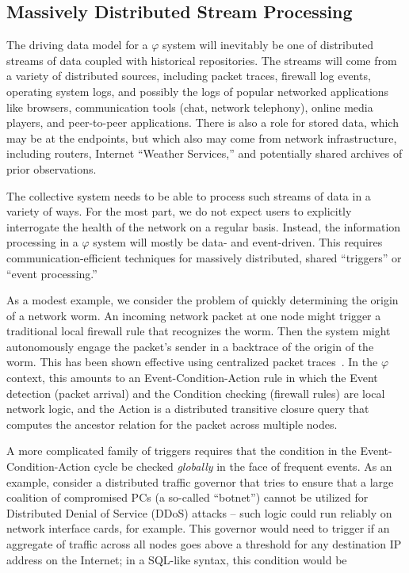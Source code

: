 \documentclass{acm_proc_article-sp}
\def\philogo{{\large $\varphi$}\xspace}
\begin{document}
\subsection{Massively Distributed Stream Processing} The driving data model for a \philogo system will inevitably be one of distributed streams of data coupled with historical repositories. The streams will come from a variety of distributed sources, including packet traces, firewall log events, operating system logs, and possibly the logs of popular networked applications like browsers, communication tools (chat, network telephony), online media players, and peer-to-peer applications. There is also a role for stored data, which may be at the endpoints, but which also may come from network infrastructure, including routers, Internet ``Weather Services,'' and potentially shared archives of prior observations.

The collective system needs to be able to process such streams of data in a variety of ways. For the most part, we do not expect users to explicitly interrogate the health of the network on a regular basis. Instead, the information processing in a \philogo system will mostly be data- and event-driven. This requires communication-efficient techniques for massively distributed, shared ``triggers'' or ``event processing.''

As a modest example, we consider the problem of quickly determining the origin of a network worm. An incoming network packet at one node might trigger a traditional local firewall rule that recognizes the worm. Then the system might autonomously engage the packet's sender in a backtrace of the origin of the worm. This has been shown effective using centralized packet traces~\cite{moonwalks}. In the \philogo context, this amounts to an Event-Condition-Action rule in which the Event detection (packet arrival) and the Condition checking (firewall rules) are local network logic, and the Action is a distributed transitive closure query that computes the ancestor relation for the packet across multiple nodes.

A more complicated family of triggers requires that the condition in the
Event-Condition-Action cycle be checked {\em globally} in the face of
frequent events. As an example, consider a distributed traffic governor that tries to ensure that a large coalition of compromised PCs (a so-called ``botnet'') cannot be utilized for Distributed Denial of Service (DDoS) attacks -- such logic could run reliably on network interface cards, for example. This governor would need to trigger if an aggregate of traffic across all nodes goes above a threshold for any destination IP address on the Internet; in a SQL-like syntax, this condition would be
\end{document}
